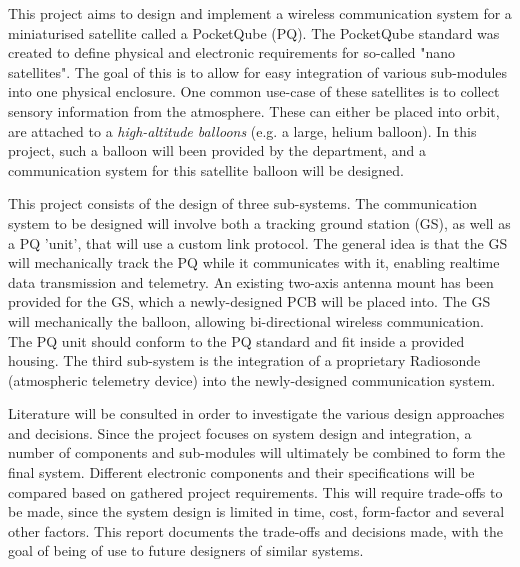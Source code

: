 This project aims to design and implement a wireless communication system for a miniaturised satellite called a PocketQube (PQ). The PocketQube standard was created to define physical and electronic requirements for so-called "nano satellites". The goal of this is to allow for easy integration of various sub-modules into one physical enclosure. One common use-case of these satellites is to collect sensory information from the atmosphere. These can either be placed into orbit, are attached to a \textit{high-altitude balloons} (e.g. a large, helium balloon). In this project, such a balloon will been provided by the department, and a communication system for this satellite balloon will be designed.

This project consists of the design of three sub-systems. The communication system to be designed will involve both a tracking ground station (GS), as well as a PQ 'unit', that will use a custom link protocol. The general idea is that the GS will mechanically track the PQ while it communicates with it, enabling realtime data transmission and telemetry. An existing two-axis antenna mount has been provided for the GS, which a newly-designed PCB will be placed into. The GS will mechanically the balloon, allowing bi-directional wireless communication. The PQ unit should conform to the PQ standard and fit inside a provided housing. The third sub-system is the integration of a proprietary Radiosonde (atmospheric telemetry device) into the newly-designed communication system.

Literature will be consulted in order to investigate the various design approaches and decisions. Since the project focuses on system design and integration, a number of components and sub-modules will ultimately be combined to form the final system. Different electronic components and their specifications will be compared based on gathered project requirements. This will require trade-offs to be made, since the system design is limited in time, cost, form-factor and several other factors. This report documents the trade-offs and decisions made, with the goal of being of use to future designers of similar systems.